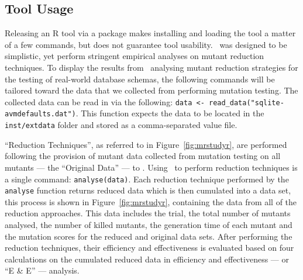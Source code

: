 \subsection{Tool Usage}





Releasing an R tool via a package makes installing and loading the tool a matter of a few commands,
but does not guarantee tool usability. \mr~was designed to be simplistic, yet perform stringent
empirical analyses on mutant reduction techniques. To display the results from \mr~analysing mutant
reduction strategies for the testing of real-world database schemas, the following commands will be
tailored toward the data that we collected from performing mutation testing. The collected data can
be read in via the following: {\small\texttt{data <- read\_data("sqlite-avmdefaults.dat")}}. This
function expects the data to be located in the \texttt{inst/extdata} folder and stored as a
comma-separated value file.






``Reduction Techniques'', as referred to in Figure~\ref{fig:mrstudyr}, are performed following the provision
of mutant data collected from mutation testing on all mutants --- the ``Original Data'' --- to \mr. Using
\mr~to perform reduction techniques is a single command: \texttt{analyse(data)}. Each reduction technique performed by
the \texttt{analyse} function returns reduced data which is then cumulated into a data set, this process is shown
in Figure~\ref{fig:mrstudyr}, containing the data from all of the reduction approaches. This data includes
the trial, the total number of mutants analysed, the number of killed mutants, the generation time of each
mutant and the mutation scores for the reduced and original data sets. After performing the reduction techniques,
their efficiency and effectiveness is evaluated based on four calculations on the cumulated reduced data in
efficiency and effectiveness --- or ``E \& E'' --- analysis.

